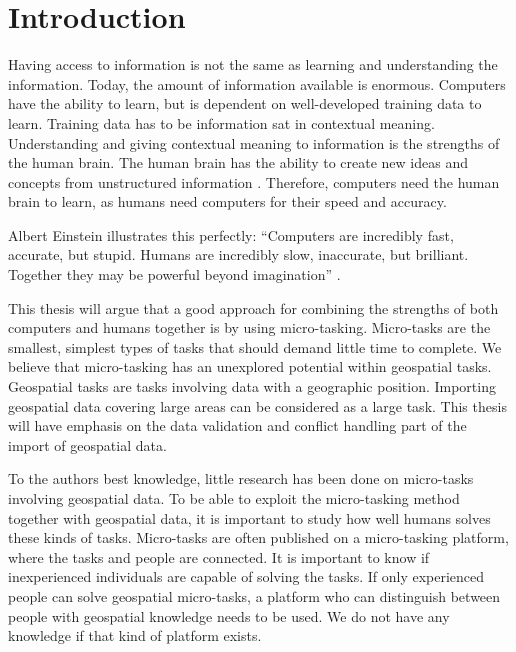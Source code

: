\chapter{Introduction}
Having access to information is not the same as learning and understanding the information. Today, the amount of information available is enormous. Computers have the ability to learn, but is dependent on well-developed training data to learn. Training data has to be information sat in contextual meaning. Understanding and giving contextual meaning to information is the strengths of the human brain. The human brain has the ability to create new ideas and concepts from unstructured information \citep{Ross2016}. Therefore, computers need the human brain to learn, as humans need computers for their speed and accuracy.  

Albert Einstein illustrates this perfectly: “Computers are incredibly fast, accurate, but stupid. Humans are incredibly slow, inaccurate, but brilliant. Together they may be powerful beyond imagination” \citep{Holzinger2013}. 

This thesis will argue that a good approach for combining the strengths of both computers and humans together is by using micro-tasking. Micro-tasks are the smallest, simplest types of tasks that should demand little time to complete. We believe that micro-tasking has an unexplored potential within geospatial tasks. Geospatial tasks are tasks involving data with a geographic position. %
Importing geospatial data covering large areas can be considered as a large task. This thesis will have emphasis on the data validation and conflict handling part of the import of geospatial data.

To the authors best knowledge, little research has been done on micro-tasks involving geospatial data. To be able to exploit the micro-tasking method together with geospatial data, it is important to study how well humans solves these kinds of tasks. Micro-tasks are often published on a micro-tasking platform, where the tasks and people are connected. It is important to know if inexperienced individuals are capable of solving the tasks. If only experienced people can solve geospatial micro-tasks, a platform who can distinguish between people with geospatial knowledge needs to be used. We do not have any knowledge if that kind of platform exists. 

